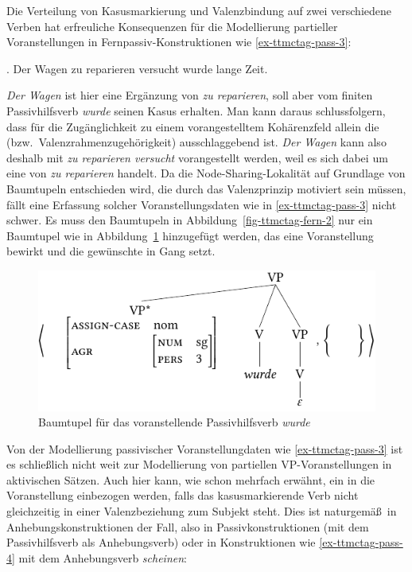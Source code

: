 Die Verteilung von Kasusmarkierung und Valenzbindung auf zwei verschiedene Verben hat erfreuliche Konsequenzen für die Modellierung partieller Voranstellungen in Fernpassiv-Konstruktionen wie \ref{ex-ttmctag-pass-3}:


\ex. \label{ex-ttmctag-pass-3} Der Wagen zu reparieren versucht wurde lange Zeit. \hfill \citep[(316-b)]{Meurers:99}

{\it Der Wagen} ist hier eine Ergänzung von {\it zu reparieren}, soll aber vom finiten Passivhilfsverb {\it wurde} seinen Kasus erhalten. Man kann daraus schlussfolgern, dass  für die Zugänglichkeit zu einem vorangestelltem Kohärenzfeld allein die  (bzw.\ Valenzrahmenzugehörigkeit) ausschlaggebend ist.  {\it Der Wagen} kann also deshalb mit {\it zu reparieren versucht} vorangestellt werden, weil es sich dabei um eine  von {\it zu reparieren} handelt. Da die Node-Sharing-Lokalität auf Grundlage von Baumtupeln entschieden wird, die durch das Valenzprinzip motiviert sein müssen, fällt eine Erfassung solcher Voranstellungsdaten wie in \ref{ex-ttmctag-pass-3} nicht schwer. Es muss den Baumtupeln in Abbildung~\ref{fig-ttmctag-fern-2} nur ein Baumtupel wie in Abbildung~\ref{fig-ttmctag-fern-3} hinzugefügt werden, das eine Voranstellung bewirkt und die gewünschte  in Gang setzt. 
\begin{figure}[t]
\centering
\includegraphics{graphics/abb724.pdf}
\caption{\label{fig-ttmctag-fern-3}Baumtupel für das voranstellende Passivhilfsverb {\it wurde}}
\end{figure}

\largerpage%
Von der Modellierung passivischer Voranstellungdaten wie \ref{ex-ttmctag-pass-3} ist es schlie\ss lich nicht weit zur Modellierung von partiellen VP-Voranstellungen in aktivischen Sätzen. Auch hier kann, wie schon mehrfach erwähnt, ein  in die Voranstellung einbezogen werden, falls das kasusmarkierende Verb nicht gleichzeitig in einer Valenzbeziehung zum Subjekt steht. Dies ist naturgemä\ss\ in Anhebungskonstruktionen der Fall, also in Passivkonstruktionen (mit dem Passivhilfsverb als Anhebungsverb) oder in Konstruktionen wie \ref{ex-ttmctag-pass-4} mit dem Anhebungsverb {\it scheinen}:  

